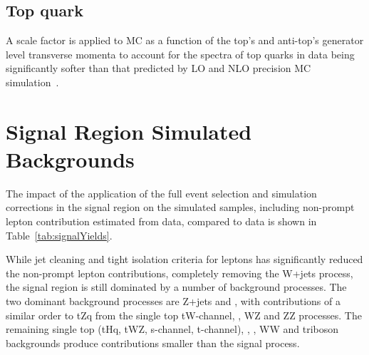 \subsection{Top quark \pt}
A scale factor is applied to \ttbar MC as a function of the top's and anti-top's generator level transverse momenta to account for the \pt spectra of top quarks in data being significantly softer than that predicted by LO and NLO precision MC simulation~\cite{Khachatryan:2015oqa}.


\section{Signal Region Simulated Backgrounds}\label{sec:simBackgrounds}
The impact of the application of the full event selection and simulation corrections in the signal region on the simulated samples, including non-prompt lepton contribution estimated from data, compared to data is shown in Table~\ref{tab:signalYields}.

While jet cleaning and tight isolation criteria for leptons has significantly reduced the non-prompt lepton contributions, completely removing the W+jets process, the signal region is still dominated by a number of background processes.
The two dominant background processes are Z+jets and \ttbar, with contributions of a similar order to tZq from the single top tW-channel, \ttbarZ, WZ and ZZ processes.
The remaining single top (tHq, tWZ, s-channel, t-channel), \ttbarW, \ttbarH, WW and triboson backgrounds produce contributions smaller than the signal process.

